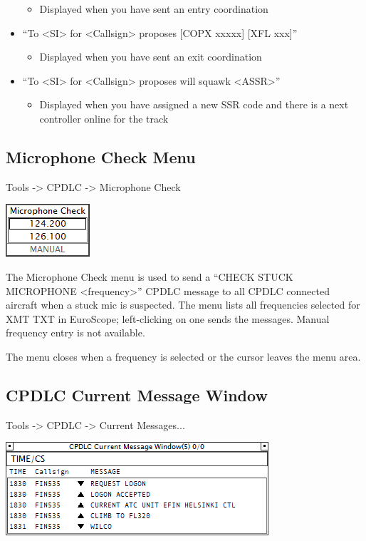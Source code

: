\documentclass[11pt,a4paper]{memoir}
\begin{document}
\begin{itemize}
        \begin{itemize}
             \item Displayed when you have sent an entry coordination
        \end{itemize}
    \item“To <SI> for <Callsign> proposes [COPX xxxxx] [XFL xxx]”
        \begin{itemize}
             \item Displayed when you have sent an exit coordination
        \end{itemize}
    \item“To <SI> for <Callsign> proposes will squawk <ASSR>”
        \begin{itemize}
             \item Displayed when you have assigned a new SSR code and there is a next controller online for the track
        \end{itemize}
\end{itemize}
    
\subsection{Microphone Check Menu}
\label{menu:dlmcm}

\textit{} Tools -> CPDLC -> Microphone Check

\includegraphics{img/dlmicchk.png}

The Microphone Check menu is used to send a “CHECK STUCK MICROPHONE <frequency>” CPDLC message to all CPDLC connected aircraft when a stuck mic is suspected. The menu lists all frequencies selected for XMT TXT in EuroScope; left-clicking on one sends the messages. Manual frequency entry is not available.

The menu closes when a frequency is selected or the cursor leaves the menu area.

\subsection{CPDLC Current Message Window}
\label{win:dlcmw}

\textit{} Tools -> CPDLC -> Current Messages...

\includegraphics{img/dlcmw.png}
\end{document}
